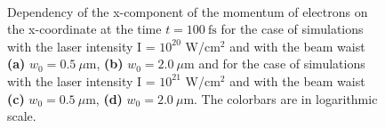 \begin{figure}[h!]
	\centering
	\\
	\caption{Dependency of the x-component of the momentum of electrons on the x-coordinate at the time $ t = 100 \ \mathrm{fs} $ for the case of simulations with the laser intensity I = $ 10^{20} $ W/cm$^2$ and with the beam waist \textbf{(a)} $ w_0 = 0.5 \ \mu\mathrm{m} $, \textbf{(b)} $ w_0 = 2.0 \ \mu\mathrm{m} $ and for the case of simulations with the laser intensity I = $ 10^{21} $ W/cm$^2$ and with the beam waist \textbf{(c)} $ w_0 = 0.5 \ \mu\mathrm{m} $, \textbf{(d)} $ w_0 = 2.0 \ \mu\mathrm{m} $. The colorbars are in logarithmic scale.}
	\label{fig:11}
\end{figure}

